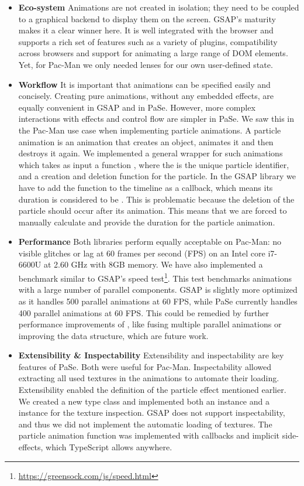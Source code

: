 \begin{itemize}
\item \textbf{Eco-system} Animations are not created in isolation; they need to
be coupled to a graphical backend to display them on the screen.  GSAP's maturity
makes it a clear winner here. It 
is well integrated with the browser and supports a rich set of features
such as a variety of plugins, compatibility across browsers and support for
animating a large range of DOM elements. Yet, for Pac-Man we only needed
lenses for our own user-defined state.
\item \textbf{Workflow} It is important that animations can
be specified easily and concisely. Creating pure animations, without
any embedded effects, are equally convenient in GSAP and in PaSe. However, more
complex interactions with effects and control flow are simpler in PaSe. We
saw this in the Pac-Man use case when implementing particle animations.
A particle animation is an animation that creates an object, animates it
and then destroys it again. We
implemented a general wrapper for such animations which takes as input a
function , where the  is the unique particle
identifier, and a creation and deletion function for the particle. In the GSAP
library we have to add the function to the timeline as a callback, which
means its duration is considered to be . This is problematic
because the deletion of
the particle should occur after its animation. This means that we are
forced to manually calculate and provide the duration for the particle
animation.
\item \textbf{Performance} Both libraries perform 
equally acceptable on Pac-Man: no visible glitches or lag at 60
frames per second (FPS) on an Intel core i7-6600U at 2.60 GHz with 8GB memory. We have also implemented a benchmark similar to GSAP's
speed test\footnote{\url{https://greensock.com/js/speed.html}}. This test
benchmarks animations with a large number of parallel components. GSAP is
slightly more optimized as it handles 500 parallel animations at 60 FPS, while
PaSe currently handles 400 parallel animations at 60 FPS.
This could be remedied by further performance improvements of \dsl{},
like fusing multiple parallel animations or improving the  data structure, which are future work.
\item \textbf{Extensibility \& Inspectability} Extensibility and inspectability
are key features of PaSe. Both were useful for Pac-Man. Inspectability allowed 
extracting all used textures in the animations to
automate their loading. Extensibility enabled the definition of the 
particle effect mentioned earlier. We
created a new  type class and implemented both an
 instance and a  instance for the texture inspection.
GSAP does not support inspectability, and thus we did not
implement the automatic loading of textures. The particle animation function
was implemented with callbacks and implicit side-effects, which TypeScript allows anywhere.
\end{itemize}
